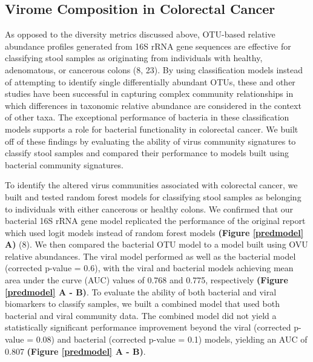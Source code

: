 \documentclass[12pt,]{article}
\begin{document}
\subsection{Virome Composition in Colorectal
Cancer}\label{virome-composition-in-colorectal-cancer}

As opposed to the diversity metrics discussed above, OTU-based relative
abundance profiles generated from 16S rRNA gene sequences are effective
for classifying stool samples as originating from individuals with
healthy, adenomatous, or cancerous colons (8, 23). By using
classification models instead of attempting to identify single
differentially abundant OTUs, these and other studies have been
successful in capturing complex community relationships in which
differences in taxonomic relative abundance are considered in the
context of other taxa. The exceptional performance of bacteria in these
classification models supports a role for bacterial functionality in
colorectal cancer. We built off of these findings by evaluating the
ability of virus community signatures to classify stool samples and
compared their performance to models built using bacterial community
signatures.

To identify the altered virus communities associated with colorectal
cancer, we built and tested random forest models for classifying stool
samples as belonging to individuals with either cancerous or healthy
colons. We confirmed that our bacterial 16S rRNA gene model replicated
the performance of the original report which used logit models instead
of random forest models \textbf{(Figure \ref{predmodel} A)} (8). We then
compared the bacterial OTU model to a model built using OVU relative
abundances. The viral model performed as well as the bacterial model
(corrected p-value = 0.6), with the viral and bacterial models achieving
mean area under the curve (AUC) values of 0.768 and 0.775, respectively
\textbf{(Figure \ref{predmodel} A - B)}. To evaluate the ability of both
bacterial and viral biomarkers to classify samples, we built a combined
model that used both bacterial and viral community data. The combined
model did not yield a statistically significant performance improvement
beyond the viral (corrected p-value = 0.08) and bacterial (corrected
p-value = 0.1) models, yielding an AUC of 0.807 \textbf{(Figure
\ref{predmodel} A - B)}.
\end{document}
